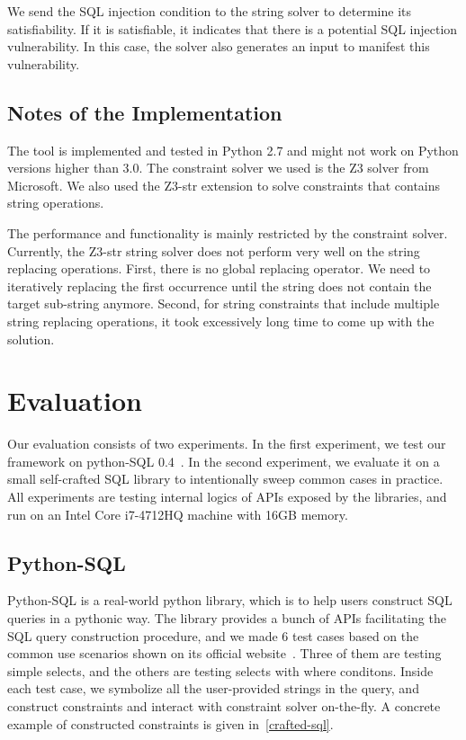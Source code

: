 \documentclass[conference]{IEEEtran}
\begin{document}
We send the SQL injection condition to the string solver to determine its satisfiability. If it is satisfiable, it indicates that there is a potential SQL injection vulnerability. In this case, the solver also generates an input to manifest this vulnerability.

\subsection{Notes of the Implementation}
\label{notes}

The tool is implemented and tested in Python 2.7 and might not work on Python versions higher than 3.0.
The constraint solver we used is the Z3 solver from Microsoft. We also used the Z3-str extension to solve constraints that contains string operations.

The performance and functionality is mainly restricted by the constraint solver. Currently, the Z3-str string solver does not perform very well on the string replacing operations. First, there is no global replacing operator. We need to iteratively replacing the first occurrence until the string does not contain the target sub-string anymore. Second, for string constraints that include multiple string replacing operations, it took excessively long time to come up with the solution.


\section{Evaluation}
\label{evaluation}
Our evaluation consists of two experiments. In the first experiment, we test our framework on python-SQL 0.4~\cite{python-sql}. In the second experiment, we evaluate it on a small self-crafted SQL library to intentionally sweep common cases in practice. All experiments are testing internal logics of APIs exposed by the libraries, and run on an Intel Core i7-4712HQ machine with 16GB memory.

\subsection{Python-SQL}
\label{python-sql}
Python-SQL is a real-world python library, which is to help users construct SQL queries in a pythonic way. The library provides a bunch of APIs facilitating the SQL query construction procedure, and we made 6 test cases based on the common use scenarios shown on its official website~\cite{python-sql}. Three of them are testing simple selects, and the others are testing selects with where conditons. Inside each test case, we symbolize all the user-provided strings in the query, and construct constraints and interact with constraint solver on-the-fly. A concrete example of constructed constraints is given in~\ref{crafted-sql}.
\end{document}
